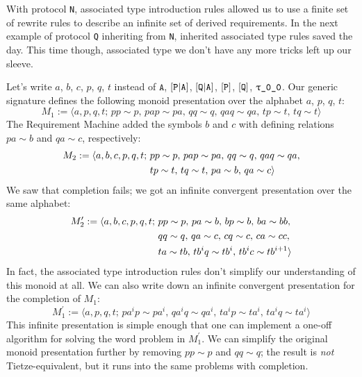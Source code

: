 \documentclass[../generics]{subfiles}
\begin{document}
\begin{example}
With protocol \texttt{N}, associated type introduction rules allowed us to use a finite set of rewrite rules to describe an infinite set of derived requirements. In the next example of protocol \texttt{Q} inheriting from \texttt{N}, inherited associated type rules saved the day. This time though, associated type we don't have any more tricks left up our sleeve.

\smallskip

Let's write $a$, $b$, $c$, $p$, $q$, $t$ instead of $\texttt{A}$, $[\texttt{P}|\texttt{A}]$, $[\texttt{Q}|\texttt{A}]$, $[\texttt{P}]$, $[\texttt{Q}]$, $\texttt{$\uptau$\_0\_0}$. Our generic signature defines the following monoid presentation over the alphabet $a$, $p$, $q$, $t$:
\[M_1 := \langle a,p,q,t;\,pp\sim p,\,pap\sim pa,\,qq\sim q,\, qaq\sim qa,\, tp\sim t,\, tq\sim t\rangle\]
The Requirement Machine added the symbols $b$ and $c$ with defining relations $pa\sim b$ and $qa\sim c$, respectively:
\begin{align*}
M_2 := \langle a,b,c,p,q,t;\,\hbox{}&pp\sim p,\,pap\sim pa,\,qq\sim q,\, qaq\sim qa,\\
&tp\sim t,\, tq\sim t,\,pa\sim b,\,qa\sim c\rangle
\end{align*}
We saw that completion fails; we got an infinite convergent presentation over the same alphabet:
\begin{align*}
M_2^\prime := \langle a,b,c,p,q,t;\,\hbox{}&pp\sim p,\,pa\sim b,\,bp\sim b,\,ba\sim bb,\\
&qq\sim q,\,qa\sim c,\,cq\sim c,\,ca\sim cc,\\
&ta\sim tb,\, tb^iq\sim tb^i,\,tb^ic\sim tb^{i+1}\rangle
\end{align*}
In fact, the associated type introduction rules don't simplify our understanding of this monoid at all. We can also write down an infinite convergent presentation for the completion of $M_1$:
\[M_1^\prime := \langle a,p,q,t;\,pa^ip\sim pa^i,\, qa^iq\sim qa^i,\, ta^ip\sim ta^i,\, ta^iq\sim ta^i\rangle\]
This infinite presentation is simple enough that one can implement a one-off algorithm for solving the word problem in $M_1^\prime$. We can simplify the original monoid presentation further by removing $pp\sim p$ and $qq\sim q$; the result is \emph{not} Tietze-equivalent, but it runs into the same problems with completion.


\end{example}
\end{document}
